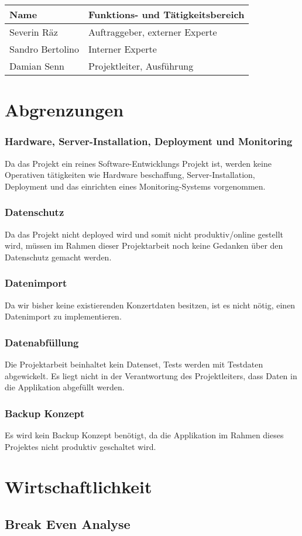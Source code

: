 \begin{longtable}[]{@{}ll@{}}
\toprule
Name & Funktions- und Tätigkeitsbereich\tabularnewline
\midrule
\endhead
Severin Räz & Auftraggeber, externer Experte\tabularnewline
Sandro Bertolino & Interner Experte\tabularnewline
Damian Senn & Projektleiter, Ausführung\tabularnewline
\bottomrule
\end{longtable}

\section{Abgrenzungen}\label{abgrenzungen}

\subsubsection{Hardware, Server-Installation, Deployment und
Monitoring}\label{hardware-server-installation-deployment-und-monitoring}

Da das Projekt ein reines Software-Entwicklungs Projekt ist, werden
keine Operativen tätigkeiten wie Hardware beschaffung,
Server-Installation, Deployment und das einrichten eines
Monitoring-Systems vorgenommen.

\subsubsection{Datenschutz}\label{datenschutz}

Da das Projekt nicht deployed wird und somit nicht produktiv/online
gestellt wird, müssen im Rahmen dieser Projektarbeit noch keine Gedanken
über den Datenschutz gemacht werden.

\subsubsection{Datenimport}\label{datenimport}

Da wir bisher keine existierenden Konzertdaten besitzen, ist es nicht
nötig, einen Datenimport zu implementieren.

\subsubsection{Datenabfüllung}\label{datenabfuxfcllung}

Die Projektarbeit beinhaltet kein Datenset, Tests werden mit Testdaten
abgewickelt. Es liegt nicht in der Verantwortung des Projektleiters,
dass Daten in die Applikation abgefüllt werden.

\subsubsection{Backup Konzept}\label{backup-konzept}

Es wird kein Backup Konzept benötigt, da die Applikation im Rahmen
dieses Projektes nicht produktiv geschaltet wird.

\section{Wirtschaftlichkeit}\label{wirtschaftlichkeit}

\subsection{Break Even Analyse}\label{break-even-analyse}

